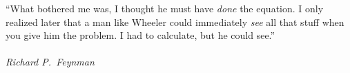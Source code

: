\clearpage

\narrowlinespacing

\vspace*{4mm}

``What bothered me was, I thought he must have \emph{done} the equation. I only realized later that a man like Wheeler could immediately \emph{see} all that stuff when you give him the problem. I had to calculate, but he could see.''\\
\\
\emph{Richard P.\ Feynman}

\normallinespacing